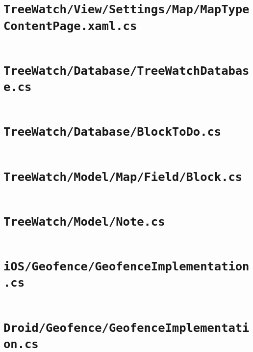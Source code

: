 \documentclass[12pt]{article}
\begin{document}
\section[\texttt{TreeWatch/View/Settings/Map/MapTypeContentPage.xaml.cs}]
{\texttt{TreeWatch/View/Settings/Map/\linebreak MapTypeContentPage.xaml.cs}}
	\inputminted[linenos,firstline=22]{csharp}{../../../src/TreeWatch/View/Settings/Map/MapTypeContentPage.xaml.cs}
	\pagebreak

\section{\texttt{TreeWatch/Database/TreeWatchDatabase.cs}}
	\inputminted[linenos,firstline=22]{csharp}{../../../src/TreeWatch/Database/TreeWatchDatabase.cs}
	\pagebreak

\section{\texttt{TreeWatch/Database/BlockToDo.cs}}
	\inputminted[linenos,firstline=22]{csharp}{../../../src/TreeWatch/Database/BlockToDo.cs}
	\pagebreak

\section{\texttt{TreeWatch/Model/Map/Field/Block.cs}}
	\inputminted[firstline=53,lastline=80]{csharp}{../../../src/TreeWatch/Model/Map/Field/Block.cs}
	\pagebreak

\section{\texttt{TreeWatch/Model/Note.cs}}
	\inputminted[firstline=81,lastline=93]{csharp}{../../../src/TreeWatch/Model/Note.cs}
	\pagebreak

\section{\texttt{iOS/Geofence/GeofenceImplementation.cs}}
	\inputminted[linenos,firstline=184]{csharp}{../../../src/iOS/Geofence/GeofenceImplementation.cs}
	\pagebreak

\section{\texttt{Droid/Geofence/GeofenceImplementation.cs}}
	\inputminted[linenos,firstline=184]{csharp}{../../../src/Droid/Geofence/GeofenceImplementation.cs}
	\pagebreak
\end{document}
